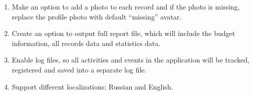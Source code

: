 \documentclass[a4paper]{article}
\begin{document}
\begin{enumerate}
\item Make an option to add a photo to each record and if the photo is missing, replace the profile photo with default “missing” avatar.

\item Create an option to output full report file, which will include the budget information, all records data and statistics data.

\item Enable log files, so all activities and events in the application will be tracked, registered and saved into a separate log file.

\item Support different localizations: Russian and English.
  
  \end{enumerate}

  
\end{document}
